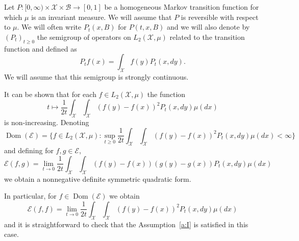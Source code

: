 \documentclass[a4paper]{amsart}
\theoremstyle{definition}
\theoremstyle{remark}
\numberwithin{equation}{section}
\newcommand{\calX}{\mathcal{X}}
\newcommand{\calB}{\mathcal{B}}
\DeclareMathOperator{\Dom}{Dom} %
\newcommand*{\calE}{\mathcal{E}}
\begin{document}
Let $P\colon [0,\infty)\times \calX \times \calB \to [0,1]$ be a homogeneous Markov transition function for which $\mu$ is an invariant measure. We will assume that $P$ is reversible with respect to $\mu$. We will often write $P_t(x,B)$ for $P(t,x,B)$ and we will also denote by $(P_t)_{t\ge 0}$ the semigroup of operators on $L_2(\calX,\mu)$ related to the transition function and defined as
\begin{displaymath}
  P_t f(x) = \int_\calX f(y)P_t(x,dy).
\end{displaymath}
We will assume that this semigroup is strongly continuous.

It can be shown that for each $f\in L_2(\calX,\mu)$ the function
\begin{displaymath}
  t\mapsto \frac{1}{2t}\int_\calX\int_\calX (f(y) - f(x))^2P_t(x,dy)\mu(dx)
\end{displaymath}
is non-increasing. Denoting
\begin{displaymath}
  \Dom(\calE) = \Big\{f \in L_2(\calX,\mu)\colon \sup_{t\ge 0} \frac{1}{2t}\int_\calX\int_\calX (f(y) - f(x))^2P_t(x,dy)\mu(dx) < \infty \Big\}
\end{displaymath}
and defining for $f,g\in \calE$,
\begin{displaymath}
  \calE(f,g) = \lim_{t\to 0} \frac{1}{2t}\int_\calX\int_\calX (f(y)-f(x))(g(y)-g(x))P_t(x,dy)\mu(dx)
\end{displaymath}
we obtain a nonnegative definite symmetric quadratic form.

In particular, for $f \in \Dom(\calE)$ we obtain
\begin{displaymath}
  \calE(f,f) = \lim_{t\to 0} \frac{1}{2t}\int_\calX\int_\calX (f(y) - f(x))^2P_t(x,dy)\mu(dx)
\end{displaymath}
and it is straightforward to check that the Assumption~\ref{a:I} is satisfied in this case.
\end{document}
